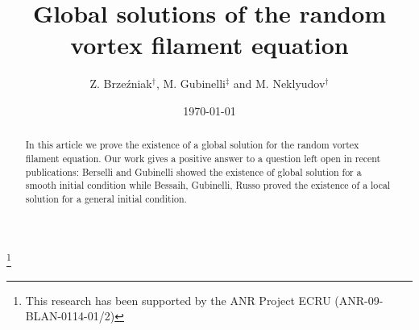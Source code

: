 \documentclass[11pt,a4paper,leqno]{amsart}%
\theoremstyle{plain}
\theoremstyle{remark}
\theoremstyle{plain}
\numberwithin{equation}{section}
\begin{document}
\title{Global solutions of the random vortex filament equation}

\author{Z. Brze\'{z}niak$^\dag$, M. Gubinelli$^\ddag$ and
M. Neklyudov$^\dag$}

\address{
$^\dag$Department of Mathematics, University of York, Heslington,
UK
\\
$^\ddag$CEREMADE \& CNRS UMR 7534, Universit\'e Paris-Dauphine,  France
}

\thanks{This research has been supported by the ANR Project ECRU (ANR-09-BLAN-0114-01/2)}



\date{\today}

\begin{abstract}
In this article we prove the existence of a global solution for the random
vortex filament equation. Our work gives a positive answer to a question left open in recent publications: Berselli and  Gubinelli \cite{[Bers+Gub_2007]}  showed the existence of global solution for a smooth  initial condition  while  Bessaih, Gubinelli, Russo \cite{[Bess+Gub_2005]} proved the existence of a local solution for a general  initial condition.
\end{abstract}


\maketitle
\end{document}
